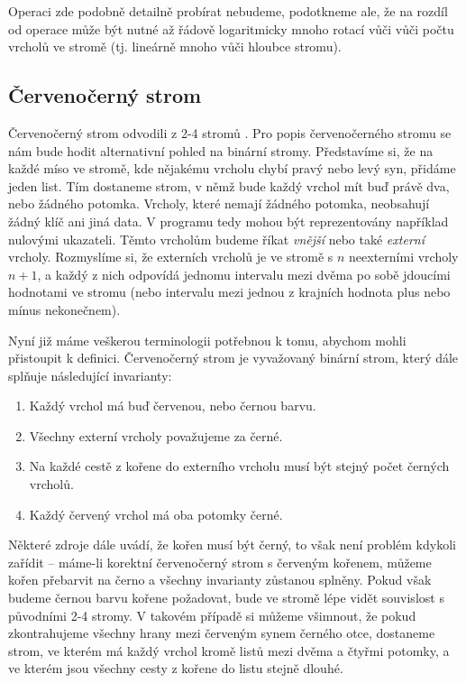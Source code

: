 Operaci  zde podobně detailně probírat nebudeme, podotkneme ale, že na rozdíl od operace  může být nutné až řádově logaritmicky mnoho rotací vůči vůči počtu vrcholů ve stromě (tj. lineárně mnoho vůči hloubce stromu).



\subsection{Červenočerný strom}\label{sec:RB}

Červenočerný strom odvodili z 2-4 stromů \citet{redblack}. Pro popis
červenočerného stromu se nám bude hodit alternativní pohled na binární stromy.
Představíme si, že na každé míso ve stromě, kde nějakému vrcholu chybí pravý nebo levý syn, přidáme jeden list.
Tím dostaneme strom, v němž bude každý vrchol mít buď právě dva, nebo
žádného potomka. Vrcholy, které nemají žádného potomka, neobsahují žádný klíč
ani jiná data. V programu tedy mohou být reprezentovány například nulovými
ukazateli. Těmto vrcholům budeme říkat \emph{vnější} nebo také \emph{externí}
vrcholy. Rozmyslíme si, že externích vrcholů je ve stromě s $n$ neexterními vrcholy $n+1$, a každý z nich odpovídá jednomu intervalu mezi dvěma po sobě jdoucími hodnotami ve stromu (nebo intervalu mezi jednou z krajních hodnota  plus nebo mínus nekonečnem).

Nyní již máme veškerou terminologii potřebnou k tomu, abychom mohli přistoupit k definici. Červenočerný strom je vyvažovaný binární strom, který dále splňuje následující invarianty:

\begin{enumerate}
\item Každý vrchol má buď červenou, nebo černou barvu.
\item Všechny externí vrcholy považujeme za černé.
\item Na každé cestě z kořene do externího vrcholu musí být stejný počet černých vrcholů.
\item Každý červený vrchol má oba potomky černé.
\end{enumerate}

Některé zdroje dále uvádí, že kořen musí být černý, to však není problém kdykoli zařídit -- máme-li korektní červenočerný strom s červeným kořenem, můžeme kořen přebarvit na černo a všechny invarianty zůstanou splněny. Pokud však budeme černou barvu kořene požadovat, bude ve stromě lépe vidět souvislost s původními 2-4 stromy. V takovém případě si můžeme všimnout, že pokud zkontrahujeme všechny hrany mezi červeným synem černého otce, dostaneme strom, ve kterém má každý vrchol kromě listů mezi dvěma a čtyřmi potomky, a ve kterém jsou všechny cesty z kořene do listu stejně dlouhé.

